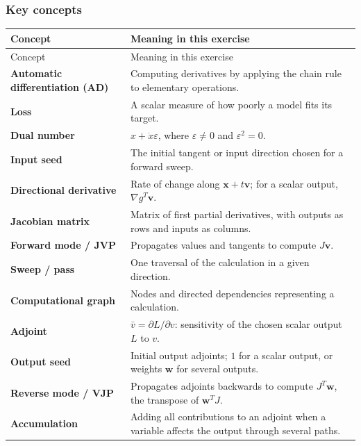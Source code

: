 \documentclass[10pt]{article}
\begin{document}
\subsubsection*{Key concepts}
\begingroup
\small
\setlength{\tabcolsep}{4pt}
\begin{longtable}{p{}p{}}
\hline
Concept & Meaning in this exercise \\
\hline
\endfirsthead
Concept & Meaning in this exercise \\
\hline
\endhead
\textbf{Automatic differentiation (AD)} & Computing derivatives by applying the chain rule to elementary operations. \\[1.5pt]
\textbf{Loss} & A scalar measure of how poorly a model fits its target. \\[1.5pt]
\textbf{Dual number} & $x+\dot x\varepsilon$, where $\varepsilon\ne0$ and $\varepsilon^2=0$. \\[1.5pt]
\textbf{Input seed} & The initial tangent or input direction chosen for a forward sweep. \\[1.5pt]
\textbf{Directional derivative} & Rate of change along $\mathbf x+t\mathbf v$; for a scalar output, $\nabla g^T\mathbf v$. \\[1.5pt]
\textbf{Jacobian matrix} & Matrix of first partial derivatives, with outputs as rows and inputs as columns. \\[1.5pt]
\textbf{Forward mode / JVP} & Propagates values and tangents to compute $J\mathbf v$. \\[1.5pt]
\textbf{Sweep / pass} & One traversal of the calculation in a given direction. \\[1.5pt]
\textbf{Computational graph} & Nodes and directed dependencies representing a calculation. \\[1.5pt]
\textbf{Adjoint} & $\bar v=\partial L/\partial v$: sensitivity of the chosen scalar output $L$ to $v$. \\[1.5pt]
\textbf{Output seed} & Initial output adjoints; $1$ for a scalar output, or weights $\mathbf w$ for several outputs. \\[1.5pt]
\textbf{Reverse mode / VJP} & Propagates adjoints backwards to compute $J^T\mathbf w$, the transpose of $\mathbf w^TJ$. \\[1.5pt]
\textbf{Accumulation} & Adding all contributions to an adjoint when a variable affects the output through several paths. \\[1.5pt]
\hline
\end{longtable}
\endgroup
\end{document}
